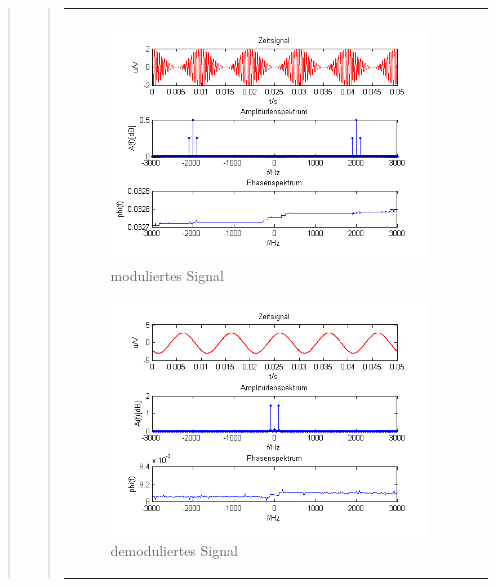 \begin{quote}
\begin{quote}
\begin{center}
\begin{tabular}{ll}
\begin{minipage}{0.67\textwidth}
                \begin{figure}[H]
                    \label{fig:DemocosinusmT}
                    \includegraphics[scale=0.7]{Bilder/Am_Cos_2k_100Hz_mo}
                    \caption{moduliertes Signal}
                \end{figure}
        
            \end{minipage}
        
            \begin{minipage}{0.67\textwidth}
                \begin{figure}[H]
                    \label{fig:DemocosinusmT2}
                    \includegraphics[scale=0.7]{Bilder/Demo_Sin_2k_100Hz_mo_mitTiefpass}
                    \caption{demoduliertes Signal}
                \end{figure}
        

\end{minipage}
\end{tabular}
\end{center}
\end{quote}
\end{quote}
